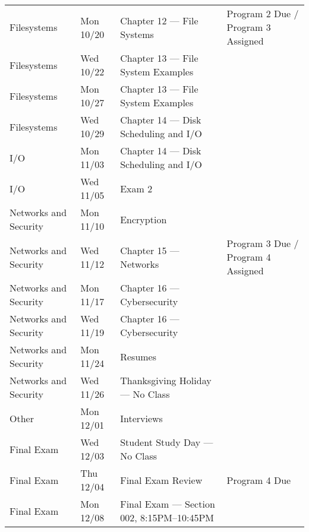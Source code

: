 \documentclass[12pt]{article}
\begin{document}
\begin{longtable}{@{} P{2.8cm} P{2.0cm} P{7.2cm} P{3.0cm} @{}}
Filesystems & Mon 10/20 & Chapter 12 — File Systems & Program 2 Due / Program 3 Assigned \\
Filesystems & Wed 10/22 & Chapter 13 — File System Examples &  \\
Filesystems & Mon 10/27 & Chapter 13 — File System Examples &  \\
Filesystems & Wed 10/29 & Chapter 14 — Disk Scheduling and I/O &  \\

I/O & Mon 11/03 & Chapter 14 — Disk Scheduling and I/O &  \\
I/O & Wed 11/05 & Exam 2 &  \\

Networks and Security & Mon 11/10 & Encryption &  \\
Networks and Security & Wed 11/12 & Chapter 15 — Networks & Program 3 Due / Program 4 Assigned \\
Networks and Security & Mon 11/17 & Chapter 16 — Cybersecurity &  \\
Networks and Security & Wed 11/19 & Chapter 16 — Cybersecurity &  \\
Networks and Security & Mon 11/24 & Resumes &  \\
Networks and Security & Wed 11/26 & Thanksgiving Holiday — No Class &  \\

Other & Mon 12/01 & Interviews &  \\

Final Exam & Wed 12/03 & Student Study Day — No Class &  \\
Final Exam & Thu 12/04 & Final Exam Review & Program 4 Due \\
Final Exam & Mon 12/08 & Final Exam — Section 002, 8:15PM–10:45PM &  \\
\end{longtable}
\end{document}
